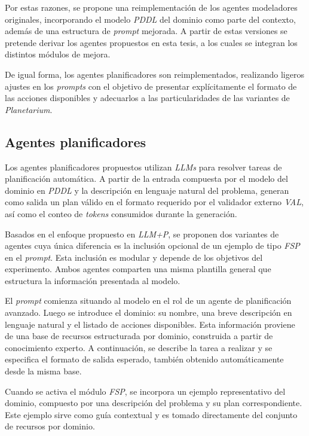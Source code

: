 Por estas razones, se propone una reimplementación de los agentes modeladores originales, incorporando el modelo \textit{PDDL} del dominio como parte del contexto, además de una estructura de \textit{prompt} mejorada. A partir de estas versiones se pretende derivar los agentes propuestos en esta tesis, a los cuales se integran los distintos módulos de mejora.

De igual forma, los agentes planificadores son reimplementados, realizando ligeros ajustes en los \textit{prompts} con el objetivo de presentar explícitamente el formato de las acciones disponibles y adecuarlos a las particularidades de las variantes de \textit{Planetarium}.

\subsection{Agentes planificadores}

Los agentes planificadores propuestos utilizan \textit{LLMs} para resolver tareas de planificación automática. A partir de la entrada compuesta por el modelo del dominio en \textit{PDDL} y la descripción en lenguaje natural del problema, generan como salida un plan válido en el formato requerido por el validador externo \textit{VAL}, así como el conteo de \textit{tokens} consumidos durante la generación.

Basados en el enfoque propuesto en \textit{LLM+P}, se proponen dos variantes de agentes cuya única diferencia es la inclusión opcional de un ejemplo de tipo \textit{FSP} en el \textit{prompt}. Esta inclusión es modular y depende de los objetivos del experimento. Ambos agentes comparten una misma plantilla general que estructura la información presentada al modelo.

El \textit{prompt} comienza situando al modelo en el rol de un agente de planificación avanzado. Luego se introduce el dominio: su nombre, una breve descripción en lenguaje natural y el listado de acciones disponibles. Esta información proviene de una base de recursos estructurada por dominio, construida a partir de conocimiento experto. A continuación, se describe la tarea a realizar y se especifica el formato de salida esperado, también obtenido automáticamente desde la misma base.

Cuando se activa el módulo \textit{FSP}, se incorpora un ejemplo representativo del dominio, compuesto por una descripción del problema y su plan correspondiente. Este ejemplo sirve como guía contextual y es tomado directamente del conjunto de recursos por dominio.

